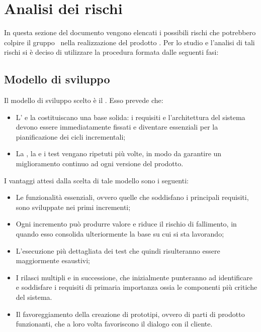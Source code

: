 \newpage
\section{Analisi dei rischi}

In questa sezione del documento vengono elencati i possibili rischi che potrebbero colpire il gruppo \gruppo\ nella realizzazione del prodotto \progetto. Per lo studio e l'analisi di tali rischi si è deciso di utilizzare la procedura formata dalle seguenti fasi:
	
\subsection{Modello di sviluppo}
Il modello di sviluppo scelto è il . Esso prevede che:
\begin{itemize}
	\item L' e la  costituiscano una base solida: i requisiti e l'architettura del sistema devono essere immediatamente fissati e diventare essenziali per la pianificazione dei cicli incrementali;
	\item La , la  e i test vengano ripetuti più volte, in modo da garantire un miglioramento continuo ad ogni versione del prodotto.
\end{itemize}

I vantaggi attesi dalla scelta di tale modello sono i seguenti:
\begin{itemize}
	\item Le funzionalità essenziali, ovvero quelle che soddisfano i principali requisiti, sono sviluppate nei primi incrementi;
	\item Ogni incremento può produrre valore e riduce il rischio di fallimento, in quando esso consolida ulteriormente la base su cui si sta lavorando;
	\item L'esecuzione più dettagliata dei test che quindi risulteranno essere maggiormente esaustivi;
	\item I rilasci multipli e in successione, che inizialmente punteranno ad identificare e soddisfare i requisiti di primaria importanza ossia le componenti più critiche del sistema. 
	\item Il favoreggiamento della creazione di prototipi, ovvero di parti di prodotto funzionanti, che a loro volta favoriscono il dialogo con il cliente.
\end{itemize}


